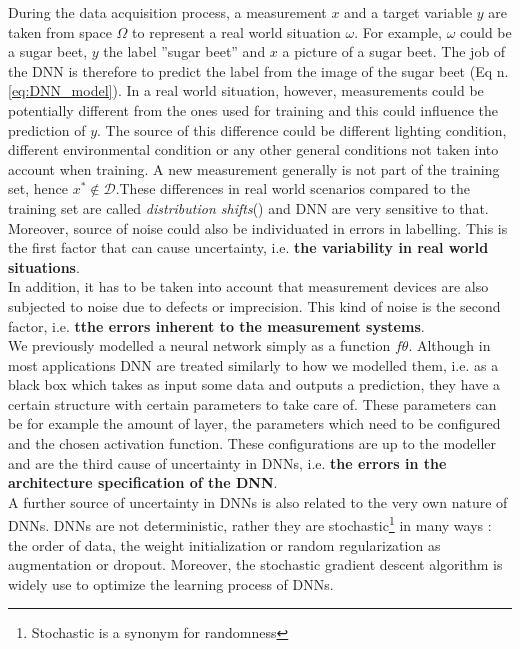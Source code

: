 During the data acquisition process, a measurement $x$ and a target variable $y$ are taken from space $\Omega$ to  represent a real world situation $\omega$. For example, $\omega$ could be a sugar beet, $y$ the label ''sugar beet'' and $x$ a picture of a sugar beet. The job of the DNN is therefore to predict the label from the image of the sugar beet (Eq n. \ref{eq:DNN_model}). In a real world situation, however, measurements could be potentially different from the ones used for training and this could influence the prediction of $y$. The source of this difference could be different lighting condition, different environmental condition or any other general conditions not taken into account when training. A new measurement generally is not part of the training set, hence $x^* \notin \mathcal{D}$.These differences in real world scenarios compared to the training set are called \textit{distribution shifts}(\cite{ovadia2019trust}) and DNN are very sensitive to that. Moreover, source of noise could also be individuated in errors in labelling. This is the first factor that can cause uncertainty, i.e. \textbf{the variability in real world situations}. \cite{gawlikowski2021survey}\\
In addition, it has to be taken into account that measurement devices are also subjected to noise due to defects or imprecision. This kind of noise is the second factor, i.e. \textbf{tthe errors inherent to the measurement systems}. \cite{gawlikowski2021survey}\\
We previously modelled a neural network simply as a function $f\theta$. Although in most applications DNN are treated similarly to how we modelled them, i.e. as a black box which takes as input some data and outputs a prediction, they have a certain structure with certain parameters to take care of. These parameters can be for example the amount of layer, the parameters which need to be configured and the chosen activation function. These configurations are up to the modeller and are the third cause of uncertainty in DNNs, i.e. \textbf{the errors in the architecture specification of the DNN}. \cite{gawlikowski2021survey}\\
A further source of uncertainty in DNNs is also related to the very own nature of DNNs. DNNs are not deterministic, rather they are stochastic\footnote{Stochastic is a synonym for randomness} in many ways : the order of data, the weight initialization or random regularization as augmentation or dropout. \cite{gawlikowski2021survey} Moreover, the stochastic gradient descent algorithm is widely use to optimize the learning process of DNNs. \cite{ruder2017overview}\\
